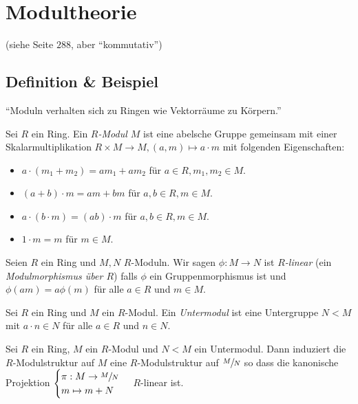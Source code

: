 \graphicspath{{Images/}}

\chapter{Modultheorie}
(siehe Seite $288$, aber \enquote{kommutativ})

\section{Definition \& Beispiel}
\enquote{Moduln verhalten sich zu Ringen wie Vektorräume zu Körpern.}

\begin{definition}
	Sei $R$ ein Ring. Ein \emph{$R$-Modul $M$} ist eine abelsche Gruppe gemeinsam mit einer Skalarmultiplikation $R \times M \to M, (a,m) \mapsto a \cdot m$
	mit folgenden Eigenschaften:
	\begin{itemize}
		\item $a \cdot (m_1 + m_2) = a m_1 + a m_2$ für $a \in R, m_1,m_2 \in M$.
		\item $(a+b) \cdot m = a m + b m$ für $a,b \in R, m \in M$.
		\item $a \cdot (b \cdot m) = (a b ) \cdot m$ für $a,b \in R, m \in M$.
		\item $1 \cdot m = m$ für $m \in M$.
	\end{itemize}
\end{definition}

\begin{definition}
	Seien $R$ ein Ring und $M,N$ $R$-Moduln. Wir sagen $\phi: M \to N$ ist \emph{$R$-linear} (ein \emph{Modulmorphismus über $R$})
	falls $\phi$ ein Gruppenmorphismus ist und $\phi(a m) = a \phi(m)$ für alle $a \in R$ und $m \in M$.
\end{definition}

\begin{definition}
	Sei $R$ ein Ring und $M$ ein $R$-Modul. Ein \emph{Untermodul} ist eine Untergruppe $N < M$ mit $a \cdot n \in N$ für alle $a \in R$ und $n \in N$.
\end{definition}

\begin{lemma}
	Sei $R$ ein Ring, $M$ ein $R$-Modul und $N < M$ ein Untermodul. Dann induziert die $R$-Modulstruktur auf $M$ eine $R$-Modulstruktur auf $\sfrac{M}{N}$ so dass
	die kanonische Projektion $\begin{cases}
		\pi: M \to \sfrac{M}{N}\\ m \mapsto m+N
	\end{cases}$ $R$-linear ist.
\end{lemma}

